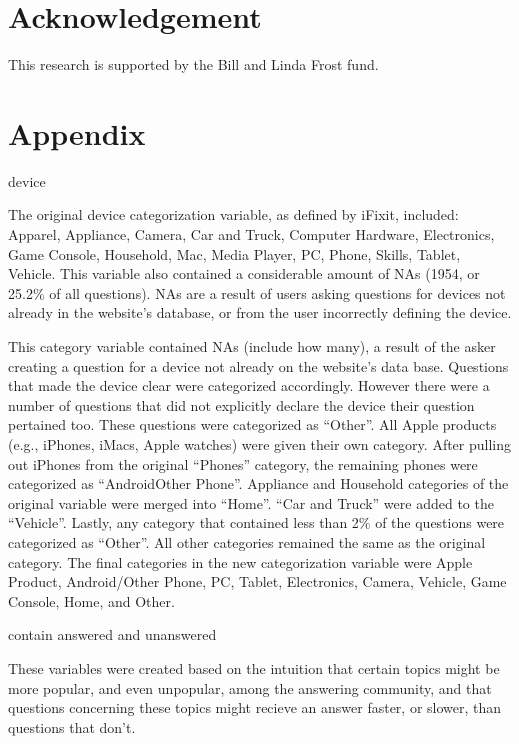\documentclass{article}
\begin{document}
\section*{Acknowledgement}

This research is supported by the Bill and Linda Frost fund. 

\section{Appendix} 

device

The original device categorization variable, as defined by iFixit, included: Apparel, Appliance, Camera, Car and Truck, Computer Hardware, Electronics, Game Console, Household, Mac, Media Player, PC, Phone, Skills, Tablet, Vehicle. This variable also contained a considerable amount of NAs (1954, or 25.2\% of all questions). NAs are a result of users asking questions for devices not already in the website's database, or from the user incorrectly defining the device. 


This category variable contained NAs (include how many), a result of the asker creating a question for a device not already on the website's data base. Questions that made the device clear were categorized accordingly. However there were a number of questions that did not explicitly declare the device their question pertained too. These questions were categorized as ``Other''. All Apple products (e.g., iPhones, iMacs, Apple watches) were given their own category. After pulling out iPhones from the original ``Phones'' category, the remaining phones were categorized as ``AndroidOther Phone''. Appliance and Household categories of the original variable were merged into ``Home''. ``Car and Truck'' were added to the ``Vehicle''. Lastly, any category that contained less than 2\% of the questions were categorized as ``Other''. All other categories remained the same as the original category. The final categories in the new categorization variable were Apple Product, Android/Other Phone, PC, Tablet, Electronics, Camera, Vehicle, Game Console, Home, and Other. 

contain answered and unanswered

  These variables were created based on the intuition that certain topics might be more popular, and even unpopular, among the answering community, and that questions concerning these topics might recieve an answer faster, or slower, than questions that don't. 
  
\end{document}
